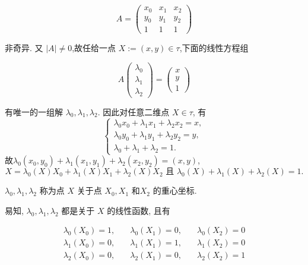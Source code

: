 \documentclass[12pt,a4paper]{article}
\begin{document}
$$
A = 
\begin{pmatrix}
x_0 & x_1 & x_2 \\
y_0 & y_1 & y_2 \\
1   & 1   & 1 
\end{pmatrix}
$$

非奇异. 
又 $|A|\ne 0$,故任给一点 $X:=(x,y)\in\tau$,下面的线性方程组

$$
A 
\begin{pmatrix}
\lambda_0 \\
\lambda_1\\
\lambda_2  
\end{pmatrix}
=\begin{pmatrix}
x \\
y\\
1  
\end{pmatrix}
$$

有唯一的一组解 $\lambda_0,\lambda_1,\lambda_2$. 
因此对任意二维点 $X\in\tau$, 有
$$
\begin{cases}
\lambda _0 x_0+\lambda _1 x_1+\lambda _2 x_2=x,\\
\lambda _0 y_0+\lambda _1 y_1+\lambda _2 y_2=y,\\
\lambda _0+ \lambda _1 +\lambda _2 =1.
\end{cases}
$$
故$\lambda _0 (x_0,y_0)+\lambda _1 (x_1,y_1)+\lambda _2 (x_2,y_2)=(x,y)$,
$$
X=\lambda_0(X) X_0 + \lambda_1(X)X_1 + \lambda_2(X)X_2 
\text{ 且 } \lambda_0(X) + \lambda_1(X) + \lambda_2(X) = 1. 
$$

$\lambda_0,\lambda_1,\lambda_2$ 称为点 $X$ 关于点 $X_0,X_1$ 和$X_2$ 的重心坐标. 

易知, $\lambda_0, \lambda_1, \lambda_2$ 都是关于 $X$ 的线性函数, 且有

\begin{eqnarray*}
\lambda_0(X_0) = 1,\quad & \lambda_0(X_1) = 0,\quad& \lambda_0(X_2) = 0\\
\lambda_1(X_0) = 0,\quad & \lambda_1(X_1) = 1,\quad& \lambda_1(X_2) = 0\\
\lambda_2(X_0) = 0,\quad & \lambda_2(X_1) = 0,\quad & \lambda_2(X_2) = 1\\
\end{eqnarray*}
\end{document}

